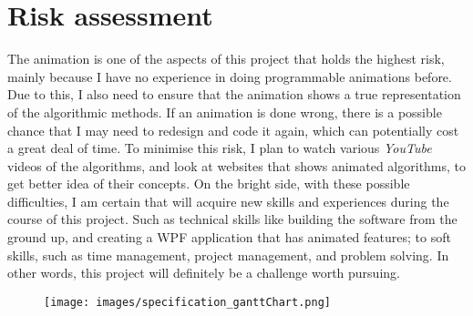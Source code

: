 \documentclass[12pt,a4paper,oneside]{report}
\begin{document}
\section*{Risk assessment}
The animation is one of the aspects of this project that holds the highest risk, mainly because I have no experience in doing programmable animations before. Due to this, I also need to ensure that the animation shows a true representation of the algorithmic methods. If an animation is done wrong, there is a possible chance that I may need to redesign and code it again, which can potentially cost a great deal of time. To minimise this risk, I plan to watch various \textit{YouTube} videos of the algorithms, and look at websites that shows animated algorithms, to get better idea of their concepts. On the bright side, with these possible difficulties, I am certain that will acquire new skills and experiences during the course of this project. Such as technical skills like building the software from the ground up, and creating a WPF application that has animated features; to soft skills, such as time management, project management, and problem solving. In other words, this project will definitely be a challenge worth pursuing.
\printbibliography[heading=secbib]

\begin{landscape}
\begin{figure}[H]
\centering
\hspace*{0cm}
\texttt{[image: images/specification\_ganttChart.png]}
\end{figure}
\end{landscape}

\end{document}

